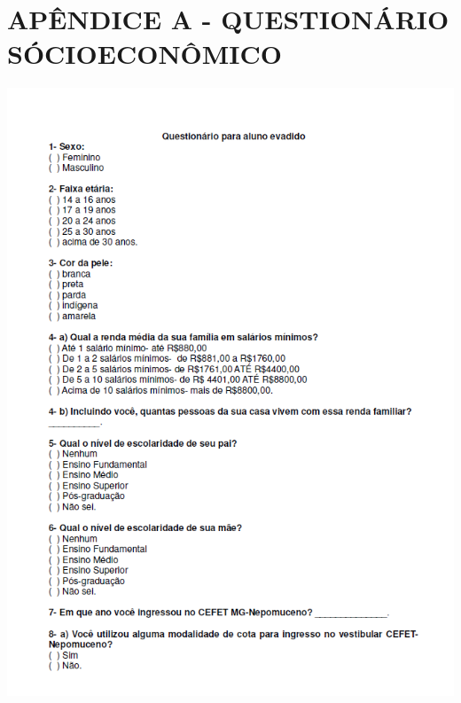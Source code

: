 \section*{\centering APÊNDICE A - QUESTIONÁRIO SÓCIOECONÔMICO}

\centering

\includegraphics[width=16cm,cfbox=black 1pt 1pt]{graphics/fig-questionario.png}